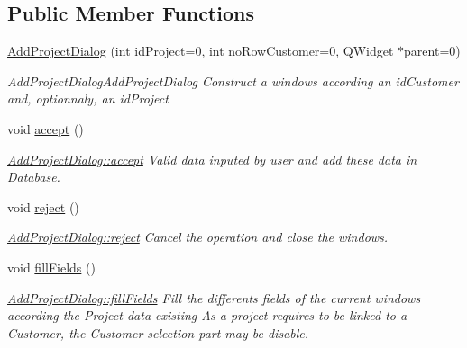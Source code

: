 \subsection*{Public Member Functions}
\begin{DoxyCompactItemize}
\item 
\hyperlink{classGui_1_1Dialogs_1_1AddProjectDialog_a73e81dfba4038bfd8d697c012a8a2d97}{Add\+Project\+Dialog} (int id\+Project=0, int no\+Row\+Customer=0, Q\+Widget $\ast$parent=0)
\begin{DoxyCompactList}\small\item\em Add\+Project\+Dialog\+Add\+Project\+Dialog Construct a windows according an {\itshape id\+Customer} and, optionnaly, an {\itshape id\+Project} \end{DoxyCompactList}\item 
\hypertarget{classGui_1_1Dialogs_1_1AddProjectDialog_abe345ededea4911846a44b984cc04f18}{}void \hyperlink{classGui_1_1Dialogs_1_1AddProjectDialog_abe345ededea4911846a44b984cc04f18}{accept} ()\label{classGui_1_1Dialogs_1_1AddProjectDialog_abe345ededea4911846a44b984cc04f18}

\begin{DoxyCompactList}\small\item\em \hyperlink{classGui_1_1Dialogs_1_1AddProjectDialog_abe345ededea4911846a44b984cc04f18}{Add\+Project\+Dialog\+::accept} Valid data inputed by user and add these data in Database. \end{DoxyCompactList}\item 
\hypertarget{classGui_1_1Dialogs_1_1AddProjectDialog_a767dcea1ae96d2efc3085f8ade4406ce}{}void \hyperlink{classGui_1_1Dialogs_1_1AddProjectDialog_a767dcea1ae96d2efc3085f8ade4406ce}{reject} ()\label{classGui_1_1Dialogs_1_1AddProjectDialog_a767dcea1ae96d2efc3085f8ade4406ce}

\begin{DoxyCompactList}\small\item\em \hyperlink{classGui_1_1Dialogs_1_1AddProjectDialog_a767dcea1ae96d2efc3085f8ade4406ce}{Add\+Project\+Dialog\+::reject} Cancel the operation and close the windows. \end{DoxyCompactList}\item 
\hypertarget{classGui_1_1Dialogs_1_1AddProjectDialog_af31b6ed23acdd5fb8b71caaeddce34f4}{}void \hyperlink{classGui_1_1Dialogs_1_1AddProjectDialog_af31b6ed23acdd5fb8b71caaeddce34f4}{fill\+Fields} ()\label{classGui_1_1Dialogs_1_1AddProjectDialog_af31b6ed23acdd5fb8b71caaeddce34f4}

\begin{DoxyCompactList}\small\item\em \hyperlink{classGui_1_1Dialogs_1_1AddProjectDialog_af31b6ed23acdd5fb8b71caaeddce34f4}{Add\+Project\+Dialog\+::fill\+Fields} Fill the differents fields of the current windows according the Project data existing As a project requires to be linked to a Customer, the Customer selection part may be disable. \end{DoxyCompactList}\end{DoxyCompactItemize}


